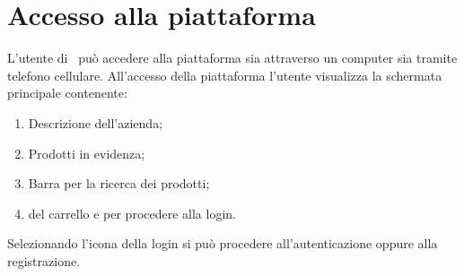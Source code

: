 \section{Accesso alla piattaforma}\label{Accesso}
L'utente di \NomeProgetto\ può accedere alla piattaforma sia attraverso un computer sia tramite telefono cellulare. All'accesso della piattaforma l'utente visualizza la schermata principale contenente:
\begin{enumerate}
	\item Descrizione dell'azienda;
	\item Prodotti in evidenza;
	\item Barra per la ricerca dei prodotti;
	\item {} del carrello e per procedere alla login.
\end{enumerate} 
Selezionando l'icona della login si può procedere all'autenticazione oppure alla registrazione.

